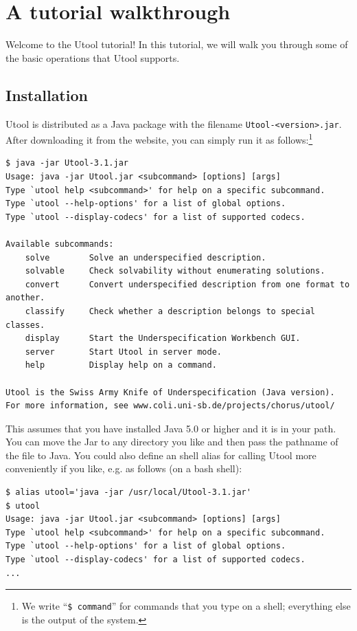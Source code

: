 
\section{A tutorial walkthrough}
\label{sec:tutorial}

Welcome to the Utool tutorial! In this tutorial, we will walk you
through some of the basic operations that Utool supports.

\subsection{Installation}

Utool is distributed as a Java package with the filename
\verb?Utool-<version>.jar?. After downloading it from the website, you
can simply run it as follows:\footnote{We write ``\texttt{\$ command}''
for commands that you type on a shell; everything else is the output
of the system.}


\begin{verbatim}
$ java -jar Utool-3.1.jar
Usage: java -jar Utool.jar <subcommand> [options] [args]
Type `utool help <subcommand>' for help on a specific subcommand.
Type `utool --help-options' for a list of global options.
Type `utool --display-codecs' for a list of supported codecs.

Available subcommands:
    solve        Solve an underspecified description.
    solvable     Check solvability without enumerating solutions.
    convert      Convert underspecified description from one format to another.
    classify     Check whether a description belongs to special classes.
    display      Start the Underspecification Workbench GUI.
    server       Start Utool in server mode.
    help         Display help on a command.

Utool is the Swiss Army Knife of Underspecification (Java version).
For more information, see www.coli.uni-sb.de/projects/chorus/utool/
\end{verbatim}

This assumes that you have installed Java 5.0 or higher and it is in
your path. You can move the Jar to any directory you like and then
pass the pathname of the file to Java. You could also define an shell
alias for calling Utool more conveniently if you like, e.g. as
follows (on a bash shell):

\begin{verbatim}
$ alias utool='java -jar /usr/local/Utool-3.1.jar'
$ utool
Usage: java -jar Utool.jar <subcommand> [options] [args]
Type `utool help <subcommand>' for help on a specific subcommand.
Type `utool --help-options' for a list of global options.
Type `utool --display-codecs' for a list of supported codecs.
...
\end{verbatim}

